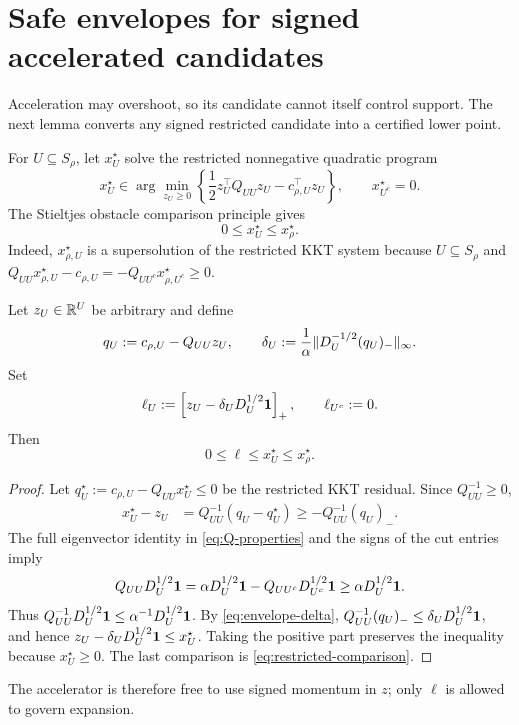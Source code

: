 \section{Safe envelopes for signed accelerated candidates}
\label{sec:safe-envelope}

Acceleration may overshoot, so its candidate cannot itself control support.
The next lemma converts any signed restricted candidate into a certified lower
point.

For $U\subseteq S_\rho$, let $x_U^\star$ solve the restricted nonnegative
quadratic program
\begin{equation}
  x_U^\star\in\arg\min_{z_U\geq0}
  \left\{\frac12z_U^\top Q_{UU}z_U-c_{\rho,U}^\top z_U\right\},
  \qquad x_{U^c}^\star=0.
  \label{eq:restricted-QP}
\end{equation}
The Stieltjes obstacle comparison principle gives
\begin{equation}
  0\leq x_U^\star\leq x_\rho^\star.
  \label{eq:restricted-comparison}
\end{equation}
Indeed, $x_{\rho,U}^\star$ is a supersolution of the restricted KKT system
because $U\subseteq S_\rho$ and
$Q_{UU}x_{\rho,U}^\star-c_{\rho,U}
=-Q_{UU^c}x_{\rho,U^c}^\star\geq0$.

\begin{theorem}
\label{thm:safe-envelope}
Let $z_U\in\mathbb{R}^U$ be arbitrary and define
\begin{equation}
 q_U:=c_{\rho,U}-Q_{UU}z_U,
 \qquad
 \delta_U:=\frac1\alpha
  \lVert D_U^{-1/2}(q_U)_-\rVert_\infty.
 \label{eq:envelope-delta}
\end{equation}
Set
\begin{equation}
 \ell_U:=\left[z_U-\delta_UD_U^{1/2}\mathbf{1}\right]_+,
 \qquad \ell_{U^c}:=0.
 \label{eq:safe-envelope}
\end{equation}
Then
\begin{equation}
  0\leq\ell\leq x_U^\star\leq x_\rho^\star.
  \label{eq:envelope-order}
\end{equation}
\end{theorem}

\begin{proof}
Let $q_U^\star:=c_{\rho,U}-Q_{UU}x_U^\star\leq0$ be the restricted KKT
residual.  Since $Q_{UU}^{-1}\geq0$,
\begin{align*}
 x_U^\star-z_U
 &=Q_{UU}^{-1}(q_U-q_U^\star)
 \geq-Q_{UU}^{-1}(q_U)_-.
\end{align*}
The full eigenvector identity in \cref{eq:Q-properties} and the signs of the
cut entries imply
\begin{equation}
 Q_{UU}D_U^{1/2}\mathbf{1}
 =\alpha D_U^{1/2}\mathbf{1}-Q_{UU^c}D_{U^c}^{1/2}\mathbf{1}
 \geq\alpha D_U^{1/2}\mathbf{1}.
\end{equation}
Thus
$Q_{UU}^{-1}D_U^{1/2}\mathbf{1}\leq\alpha^{-1}D_U^{1/2}\mathbf{1}$.
By \cref{eq:envelope-delta},
$Q_{UU}^{-1}(q_U)_-\leq\delta_UD_U^{1/2}\mathbf{1}$, and hence
$z_U-\delta_UD_U^{1/2}\mathbf{1}\leq x_U^\star$.  Taking the positive part preserves
the inequality because $x_U^\star\geq0$.  The last comparison is
\cref{eq:restricted-comparison}.
\end{proof}

The accelerator is therefore free to use signed momentum in $z$; only
$\ell$ is allowed to govern expansion.
